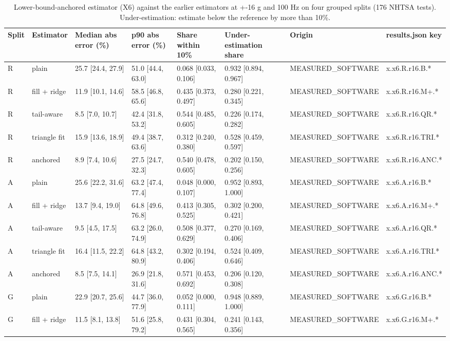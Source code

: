 \begin{table}[t]
\centering
\small
\caption{Lower-bound-anchored estimator (X6) against the earlier estimators at +-16 g and 100 Hz on four grouped splits (176 NHTSA tests). Under-estimation: estimate below the reference by more than 10\%.}
\label{tab:jp_tab_x6_anchored}
\begin{tabular}{llllllll}
\toprule
Split & Estimator & Median abs error (\%) & p90 abs error (\%) & Share within 10\% & Under-estimation share & Origin & results.json key \\
\midrule
R & plain & 25.7 [24.4, 27.9] & 51.0 [44.4, 63.0] & 0.068 [0.033, 0.106] & 0.932 [0.894, 0.967] & MEASURED\_SOFTWARE & x.x6.R.r16.B.* \\
R & fill + ridge & 11.9 [10.1, 14.6] & 58.5 [46.8, 65.6] & 0.435 [0.373, 0.497] & 0.280 [0.221, 0.345] & MEASURED\_SOFTWARE & x.x6.R.r16.M+.* \\
R & tail-aware & 8.5 [7.0, 10.7] & 42.4 [31.8, 53.2] & 0.544 [0.485, 0.605] & 0.226 [0.174, 0.282] & MEASURED\_SOFTWARE & x.x6.R.r16.QR.* \\
R & triangle fit & 15.9 [13.6, 18.9] & 49.4 [38.7, 63.6] & 0.312 [0.240, 0.380] & 0.528 [0.459, 0.597] & MEASURED\_SOFTWARE & x.x6.R.r16.TRI.* \\
R & anchored & 8.9 [7.4, 10.6] & 27.5 [24.7, 32.3] & 0.540 [0.478, 0.605] & 0.202 [0.150, 0.256] & MEASURED\_SOFTWARE & x.x6.R.r16.ANC.* \\
A & plain & 25.6 [22.2, 31.6] & 63.2 [47.4, 77.4] & 0.048 [0.000, 0.107] & 0.952 [0.893, 1.000] & MEASURED\_SOFTWARE & x.x6.A.r16.B.* \\
A & fill + ridge & 13.7 [9.4, 19.0] & 64.8 [49.6, 76.8] & 0.413 [0.305, 0.525] & 0.302 [0.200, 0.421] & MEASURED\_SOFTWARE & x.x6.A.r16.M+.* \\
A & tail-aware & 9.5 [4.5, 17.5] & 63.2 [26.0, 74.9] & 0.508 [0.377, 0.629] & 0.270 [0.169, 0.406] & MEASURED\_SOFTWARE & x.x6.A.r16.QR.* \\
A & triangle fit & 16.4 [11.5, 22.2] & 64.8 [43.2, 80.9] & 0.302 [0.194, 0.406] & 0.524 [0.409, 0.646] & MEASURED\_SOFTWARE & x.x6.A.r16.TRI.* \\
A & anchored & 8.5 [7.5, 14.1] & 26.9 [21.8, 31.6] & 0.571 [0.453, 0.692] & 0.206 [0.120, 0.308] & MEASURED\_SOFTWARE & x.x6.A.r16.ANC.* \\
G & plain & 22.9 [20.7, 25.6] & 44.7 [36.0, 77.9] & 0.052 [0.000, 0.111] & 0.948 [0.889, 1.000] & MEASURED\_SOFTWARE & x.x6.G.r16.B.* \\
G & fill + ridge & 11.5 [8.1, 13.8] & 51.6 [25.8, 79.2] & 0.431 [0.304, 0.565] & 0.241 [0.143, 0.356] & MEASURED\_SOFTWARE & x.x6.G.r16.M+.* \\

\end{tabular}
\end{table}
